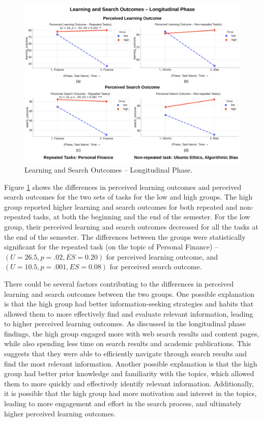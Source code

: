 \documentclass[letterpaper, nobind]{templates/ociamthesis}
\begin{document}
\begin{figure}

{\centering \includegraphics[width=1\linewidth]{figs/rp13-learning-search-outcomes} 

}

\caption[Learning and Search Outcomes -- Longitudinal Phase.]{Learning and Search Outcomes -- Longitudinal Phase.}\label{fig:rp13-learning-search-outcomes}
\end{figure}





Figure \ref{fig:rp13-learning-search-outcomes} shows the differences in perceived learning outcomes and perceived search outcomes for the two sets of tasks for the low and high groups.
The high group reported higher learning and search outcomes for both repeated and non-repeated tasks, at both the beginning and the end of the semester.
For the low group, their perceived learning and search outcomes decreased for all the tasks at the end of the semester.
The differences between the groups were statistically significant for the repeated task (on the topic of Personal Finance) -- \((U = 26.5, p = .02, ES = 0.20)\) for perceived learning outcome, and \((U = 10.5, p = .001, ES = 0.08)\) for perceived search outcome.

There could be several factors contributing to the differences in perceived learning and search outcomes between the two groups.
One possible explanation is that the high group had better information-seeking strategies and habits that allowed them to more effectively find and evaluate relevant information, leading to higher perceived learning outcomes. As discussed in the longitudinal phase findings, the high group engaged more with web search results and content pages, while also spending less time on search results and academic publications. This suggests that they were able to efficiently navigate through search results and find the most relevant information.
Another possible explanation is that the high group had better prior knowledge and familiarity with the topics, which allowed them to more quickly and effectively identify relevant information.
Additionally, it is possible that the high group had more motivation and interest in the topics, leading to more engagement and effort in the search process, and ultimately higher perceived learning outcomes.
\end{document}
